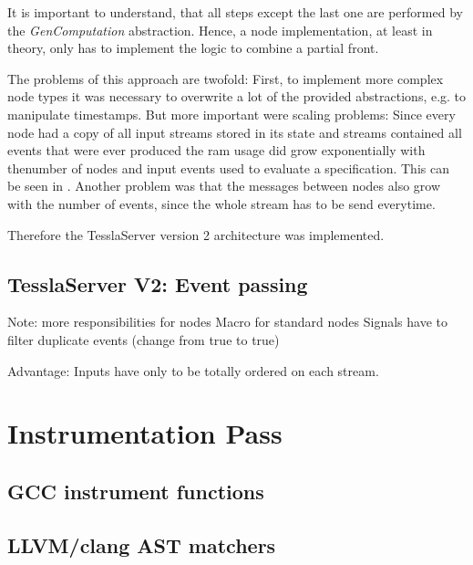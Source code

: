 It is important to understand, that all steps except the last one are performed by the \emph{GenComputation} abstraction.
Hence, a node implementation, at least in theory, only has to implement the logic to combine a partial front.

The problems of this approach are twofold:
First, to implement more complex node types it was necessary to overwrite a lot of the provided abstractions, e.g. to manipulate timestamps.
But more important were scaling problems: Since every node had a copy of all input streams stored in its state and streams contained all events that were ever produced the \gls{ram} usage did grow exponentially with thenumber of nodes and input events used to evaluate a specification.
This can be seen in .
Another problem was that the messages between nodes also grow with the number of events, since the whole stream has to be send everytime.

Therefore the TesslaServer version 2 architecture was implemented.

\subsection{TesslaServer V2: Event passing}
\label{sec:implementation:tesslaserver:v2}
Note: more responsibilities for nodes
Macro for standard nodes
Signals have to filter duplicate events (change from true to true)

Advantage: Inputs have only to be totally ordered on each stream.

\section{Instrumentation Pass}
\label{sec:implementation:instrumentation}


\subsection{GCC instrument functions}
\subsection{LLVM/clang AST matchers}
